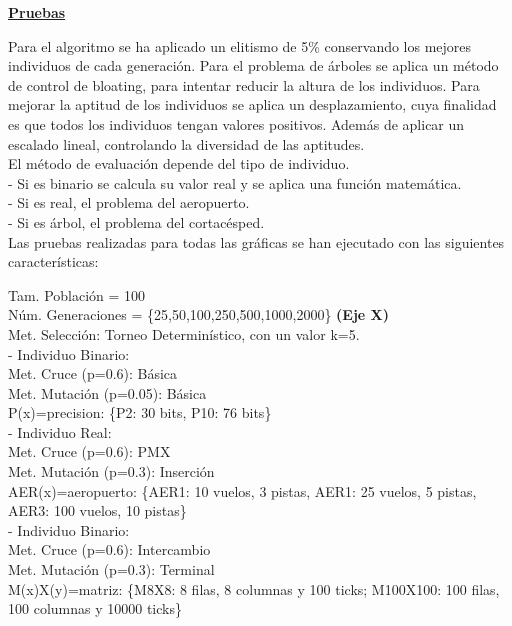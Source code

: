 	\begin{flushleft}			
	\begin{mdframed}[roundcorner=5pt]
		\textbf{\underline{Pruebas}}
		\vspace{0.1cm}
		
		\scriptsize		
		Para el algoritmo se ha aplicado un elitismo de 5\% conservando los mejores individuos de cada generación. Para el problema de árboles se aplica un método de control de bloating, para intentar reducir la altura de los individuos. 		
		Para mejorar la aptitud de los individuos se aplica un desplazamiento, cuya finalidad es que todos los individuos tengan valores positivos. Además de aplicar un escalado lineal, controlando la diversidad de las aptitudes.\\
		
		El método de evaluación depende del tipo de individuo. \\
		- Si es binario se calcula su valor real y se aplica una función matemática.  \\
		- Si es real, el problema del aeropuerto. \\
		- Si es árbol, el problema del cortacésped.\\
		
		Las pruebas realizadas para todas las gráficas se han ejecutado con las siguientes características:
		\begin{tcolorbox}[boxrule=0.5pt, fontupper=\small]
			\scriptsize
			Tam. Población = 100\\
			Núm. Generaciones = \{25,50,100,250,500,1000,2000\} \textbf{(Eje X)}\\
			Met. Selección: Torneo Determinístico, con un valor k=5.\\
			
			- Individuo Binario:\\
			Met. Cruce (p=0.6): Básica\\
			Met. Mutación (p=0.05): Básica \\
			P(x)=precision: \{P2: 30 bits, P10: 76 bits\}\\
			
			- Individuo Real:\\
			Met. Cruce (p=0.6): PMX\\
			Met. Mutación (p=0.3): Inserción \\
			AER(x)=aeropuerto: \{AER1: 10 vuelos, 3 pistas, AER1: 25 vuelos, 5 pistas, AER3: 100 vuelos, 10 pistas\}\\
			
			- Individuo Binario:\\
			Met. Cruce (p=0.6): Intercambio\\
			Met. Mutación (p=0.3): Terminal \\
			M(x)X(y)=matriz: \{M8X8: 8 filas, 8 columnas y 100 ticks; M100X100: 100 filas, 100 columnas y 10000 ticks\}				
			
		\end{tcolorbox}
		
	\end{mdframed}
	\end{flushleft}

